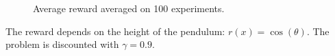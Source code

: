 \begin{figure}
\begin{minipage}{\textwidth}
\centering
{}
\hspace{-1.025cm}
\end{minipage}
\caption{Average reward averaged on 100 experiments.}\label{F:forex}
\end{figure}
The reward depends on the height of the pendulum: $r(x) = \cos(\theta)$.
The problem is discounted with $\gamma = 0.9$.
